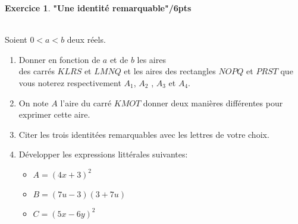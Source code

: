 \documentclass[a4paper,10.9pt]{article}
\theoremstyle{definition}
\newtheorem{exo}{Exercice}
\begin{document}
\begin{exo}\textbf{"Une identité remarquable"}\hfill\textbf{/6pts}\\\hfil\\
\begin{minipage}[c]{1.0\linewidth}
\begin{minipage}[c]{0.45\linewidth}
\noindent Soient $0< a < b$ deux réels.
\begin{enumerate}
\item Donner en fonction de $a$ et de $b$ les aires \\des carrés $KLRS$ et $LMNQ$ et les aires des rectangles $NOPQ$ et $PRST$ que vous noterez respectivement $A_1$, $A_2$ , $A_3$ et $A_4$. \\
\item On note $A$ l'aire du carré $KMOT$ donner deux manières différentes pour exprimer cette aire. \\
\item Citer les trois identitées remarquables avec les lettres de votre choix.\\
\item Développer les expressions littérales suivantes:
\begin{itemize}[$\square$]
\item $A = (4x+3)^2$
\item $B = (7u-3)(3+7u)$
\item $C = (5x-6y)^2$\\
\end{itemize}
\end{enumerate}
\end{minipage}\hfill
\begin{minipage}[c]{0.45\linewidth}

\end{minipage}
\end{minipage}
\end{exo}
\end{document}
